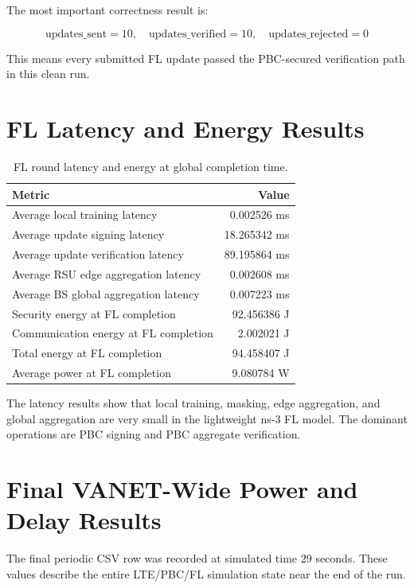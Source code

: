 \documentclass[11pt,a4paper]{article}
\begin{document}
The most important correctness result is:

\[
\text{updates\_sent}=10,\quad
\text{updates\_verified}=10,\quad
\text{updates\_rejected}=0
\]

This means every submitted FL update passed the PBC-secured verification path in
this clean run.

\section{FL Latency and Energy Results}

\begin{table}[h]
\centering
\caption{FL round latency and energy at global completion time.}
\label{tab:fl-latency-energy}
\begin{tabular}{lr}
\toprule
\textbf{Metric} & \textbf{Value} \\
\midrule
Average local training latency & 0.002526 ms \\
Average update signing latency & 18.265342 ms \\
Average update verification latency & 89.195864 ms \\
Average RSU edge aggregation latency & 0.002608 ms \\
Average BS global aggregation latency & 0.007223 ms \\
Security energy at FL completion & 92.456386 J \\
Communication energy at FL completion & 2.002021 J \\
Total energy at FL completion & 94.458407 J \\
Average power at FL completion & 9.080784 W \\
\bottomrule
\end{tabular}
\end{table}

The latency results show that local training, masking, edge aggregation, and
global aggregation are very small in the lightweight ns-3 FL model. The dominant
operations are PBC signing and PBC aggregate verification.

\section{Final VANET-Wide Power and Delay Results}

The final periodic CSV row was recorded at simulated time 29 seconds. These
values describe the entire LTE/PBC/FL simulation state near the end of the run.
\end{document}
